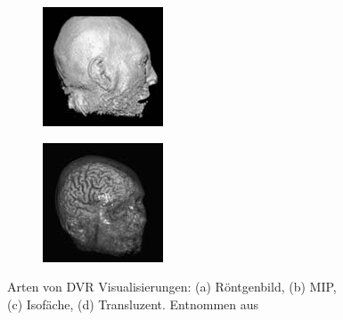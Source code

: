 \documentclass[a4paper,fontsize=12pt,toc=bib,halfparskip]{scrartcl}
\begin{document}
\begin{figure}
\begin{subfigure}{0.24\textwidth}
		\subcaption{}
		\label{DVR:MIP}
	\end{subfigure}
	\begin{subfigure}{0.24\textwidth}
		\includegraphics[width=\textwidth]{pictures/Iso.png}
		\subcaption{}
		\label{DVR:Isosurface}
	\end{subfigure}
	\begin{subfigure}{0.24\textwidth}
		\includegraphics[width=\textwidth]{pictures/Trans.png}
		\subcaption{}
		\label{DVR:Translucent}
	\end{subfigure}
	\caption{Arten von DVR Visualisierungen: (a) R\"ontgenbild, (b) MIP,\\ 
		(c) Isof\"ache, (d) Transluzent. Entnommen aus \cite[S.~134]{hansen2005visualization}}
	\label{DVRModes}
\end{figure}
\end{document}
